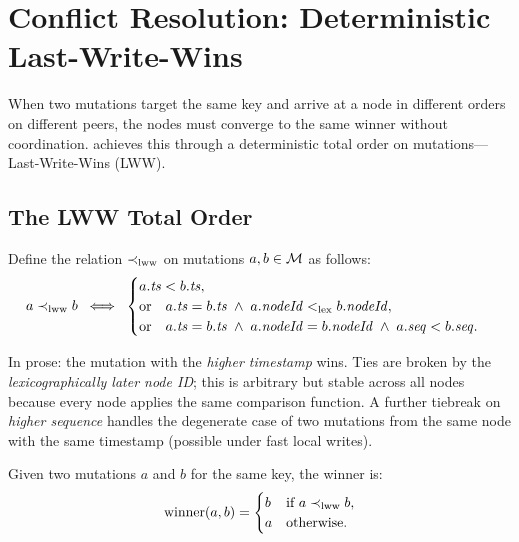 \section{Conflict Resolution: Deterministic Last-Write-Wins}
\label{sec:conflict}

When two mutations target the same key and arrive at a node in different orders
on different peers, the nodes must converge to the same winner without
coordination. \pebble{} achieves this through a deterministic total order on
mutations---Last-Write-Wins (LWW).

\subsection{The LWW Total Order}

\begin{definition}
\label{def:lww-order}
Define the relation $\prec_{\mathrm{lww}}$ on mutations $a, b \in \mathcal{M}$ as follows:
\[
  a \prec_{\mathrm{lww}} b \;\iff\;
  \begin{cases}
    a.\mathit{ts} < b.\mathit{ts}, & \\
    \text{or}\quad a.\mathit{ts} = b.\mathit{ts} \;\land\; a.\mathit{nodeId} <_{\mathrm{lex}} b.\mathit{nodeId}, & \\
    \text{or}\quad a.\mathit{ts} = b.\mathit{ts} \;\land\; a.\mathit{nodeId} = b.\mathit{nodeId}
               \;\land\; a.\mathit{seq} < b.\mathit{seq}. &
  \end{cases}
\]
\end{definition}

In prose: the mutation with the \emph{higher timestamp} wins. Ties are broken by
the \emph{lexicographically later node ID}; this is arbitrary but stable across
all nodes because every node applies the same comparison function. A further
tiebreak on \emph{higher sequence} handles the degenerate case of two mutations
from the same node with the same timestamp (possible under fast local writes).

\begin{definition}[Winner]
\label{def:winner}
Given two mutations $a$ and $b$ for the same key, the winner is:
\[
  \mathrm{winner}(a, b) =
  \begin{cases}
    b & \text{if } a \prec_{\mathrm{lww}} b, \\
    a & \text{otherwise.}
  \end{cases}
\]
\end{definition}

